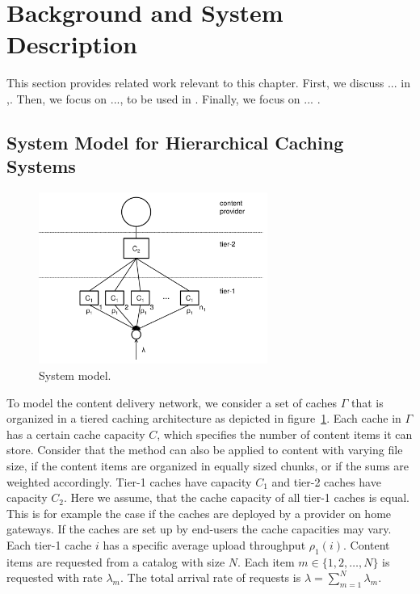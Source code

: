 \section{Background and System Description}\label{sec:hierarchical:related_work}
This section provides related work relevant to this chapter.
First, we discuss ... in ,.
Then, we focus on ..., to be used in .
Finally, we focus on ... .

\subsection{System Model for Hierarchical Caching Systems}

\begin{figure}[tb]
\centering
\includegraphics[width=75mm]{hierarchical/analyticbw/figures/hcmodel}
\caption{System model.}
\label{fig:hcmodel}
\end{figure}

To model the content delivery network, we consider a set of caches $\Gamma$ that is organized in a tiered caching architecture as depicted in figure~\ref{fig:hcmodel}. Each cache in $\Gamma$ has a certain cache capacity $C$, which specifies the number of content items it can store.
Consider that the method can also be applied to content with varying file size, if the content items are organized in equally sized chunks, or if the sums are weighted accordingly.
Tier-1 caches have capacity $C_1$ and tier-2 caches have capacity $C_2$.
Here we assume, that the cache capacity of all tier-1 caches is equal.
This is for example the case if the caches are deployed by a provider on home gateways.
If the caches are set up by end-users the cache capacities may vary.
Each tier-1 cache $i$ has a specific average upload throughput $\rho_1(i)$.
Content items are requested from a catalog with size $N$.
Each item $m\in \{1,2,\dots,N\}$ is requested with rate $\lambda_m$.
The total arrival rate of requests is $\lambda=\sum_{m=1}^N \lambda_m$.

